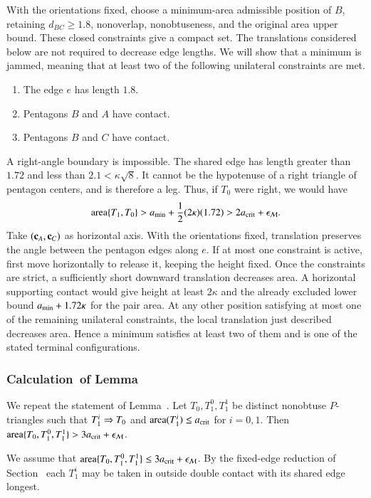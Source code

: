 With the orientations fixed, choose a minimum-area admissible
position of $B$, retaining $d_{BC}\ge1.8$, nonoverlap,
nonobtuseness, and the original area upper bound. These closed
constraints give a compact set. The translations considered below
are not required to decrease edge lengths. We will show that a
minimum is jammed, meaning that at least two of the following
unilateral constraints are met.
\begin{enumerate}
\item The edge $e$ has length $1.8$.
\item Pentagons $B$ and $A$ have contact.
\item Pentagons $B$ and $C$ have contact.
\end{enumerate}
 
A right-angle boundary is impossible. The shared edge has length
greater than $1.72$ and less than $2.1<\kappa\sqrt8$. It cannot be
the hypotenuse of a right triangle of pentagon centers, and is
therefore a leg. Thus, if $T_0$ were right, we would have
\[
{\operatorname{area}}\{T_1,T_0\} > a_\text{min} + \frac12(2\kappa)(1.72) > 2 a_\text{crit} + \epsilon_{\mathcal M}.
\]
Take $({\mathbf c}_A,{\mathbf c}_C)$ as horizontal axis. With the orientations
fixed, translation preserves the angle between the pentagon edges
along $e$. If at most one constraint is active, first move horizontally
to release it, keeping the height fixed. Once the constraints are
strict, a sufficiently short downward translation decreases area.
A horizontal supporting contact would give height at least
$2\kappa$ and the already excluded lower bound $a_\text{min}+1.72\kappa$
for the pair area. At any other position satisfying at most one
of the remaining unilateral constraints, the local translation
just described decreases area. Hence a minimum satisfies at least
two of them and is one of the stated terminal configurations.

\subsubsection{Calculation~of Lemma~} %

We repeat the statement of Lemma~. Let
$T_0,T_1^0,T_1^1$ be distinct nonobtuse $P$-triangles such that
$T_1^i\Rightarrow T_0$ and ${\operatorname{area}}(T_1^i)\le a_\text{crit}$ for $i=0,1$. Then ${\operatorname{area}}\{T_0,T_1^0,T_1^1\} > 3a_\text{crit} +
\epsilon_{\mathcal M}$. %

We assume that ${\operatorname{area}}\{T_0,T_1^0,T_1^1\}\le 3a_\text{crit} + \epsilon_{\mathcal M}$.
By the fixed-edge reduction of Section~ each $T_1^i$
may be taken in outside double contact with its shared edge longest.

